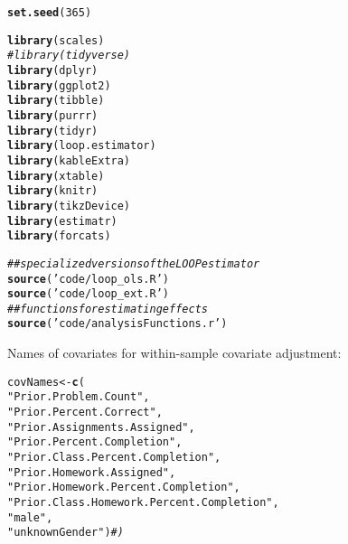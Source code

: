 \documentclass[12pt]{article}\usepackage[]{graphicx}\usepackage[]{xcolor}
\makeatletter
\newcommand{\hlnum}[1]{\textcolor[rgb]{0.686,0.059,0.569}{#1}}%
\newcommand{\hlstr}[1]{\textcolor[rgb]{0.192,0.494,0.8}{#1}}%
\newcommand{\hlcom}[1]{\textcolor[rgb]{0.678,0.584,0.686}{\textit{#1}}}%
\newcommand{\hlstd}[1]{\textcolor[rgb]{0.345,0.345,0.345}{#1}}%
\newcommand{\hlkwb}[1]{\textcolor[rgb]{0.69,0.353,0.396}{#1}}%
\newcommand{\hlkwd}[1]{\textcolor[rgb]{0.737,0.353,0.396}{\textbf{#1}}}%
\newenvironment{kframe}{%
 \def\at@end@of@kframe{}%
 \ifinner\ifhmode%
  \def\at@end@of@kframe{\end{minipage}}%
  \begin{minipage}{\columnwidth}%
 \fi\fi%
 \def\FrameCommand##1{\hskip\@totalleftmargin \hskip-\fboxsep
 \colorbox{shadecolor}{##1}\hskip-\fboxsep
     \hskip-\linewidth \hskip-\@totalleftmargin \hskip\columnwidth}%
 \MakeFramed {\advance\hsize-\width
   \@totalleftmargin\z@ \linewidth\hsize
   \@setminipage}}%
 {\par\unskip\endMakeFramed%
 \at@end@of@kframe}
\newenvironment{knitrout}{}{} %
\makeatother
\begin{document}
\begin{knitrout}
\color{fgcolor}\begin{kframe}
\begin{alltt}
\hlkwd{set.seed}\hlstd{(}\hlnum{365}\hlstd{)}
\end{alltt}
\end{kframe}
\end{knitrout}

\begin{knitrout}
\color{fgcolor}\begin{kframe}
\begin{alltt}
\hlkwd{library}\hlstd{(scales)}
\hlcom{#library(tidyverse)}
\hlkwd{library}\hlstd{(dplyr)}
\hlkwd{library}\hlstd{(ggplot2)}
\hlkwd{library}\hlstd{(tibble)}
\hlkwd{library}\hlstd{(purrr)}
\hlkwd{library}\hlstd{(tidyr)}
\hlkwd{library}\hlstd{(loop.estimator)}
\hlkwd{library}\hlstd{(kableExtra)}
\hlkwd{library}\hlstd{(xtable)}
\hlkwd{library}\hlstd{(knitr)}
\hlkwd{library}\hlstd{(tikzDevice)}
\hlkwd{library}\hlstd{(estimatr)}
\hlkwd{library}\hlstd{(forcats)}


\hlcom{## specialized versions of the LOOP estimator}
\hlkwd{source}\hlstd{(}\hlstr{'code/loop_ols.R'}\hlstd{)}
\hlkwd{source}\hlstd{(}\hlstr{'code/loop_ext.R'}\hlstd{)}
\hlcom{## functions for estimating effects}
\hlkwd{source}\hlstd{(}\hlstr{'code/analysisFunctions.r'}\hlstd{)}
\end{alltt}
\end{kframe}
\end{knitrout}

Names of covariates for within-sample covariate adjustment:
\begin{knitrout}
\color{fgcolor}\begin{kframe}
\begin{alltt}
\hlstd{covNames} \hlkwb{<-} \hlkwd{c}\hlstd{(}
    \hlstr{"Prior.Problem.Count"}\hlstd{,}
    \hlstr{"Prior.Percent.Correct"}\hlstd{,}
    \hlstr{"Prior.Assignments.Assigned"}\hlstd{,}
    \hlstr{"Prior.Percent.Completion"}\hlstd{,}
    \hlstr{"Prior.Class.Percent.Completion"}\hlstd{,}
    \hlstr{"Prior.Homework.Assigned"}\hlstd{,}
    \hlstr{"Prior.Homework.Percent.Completion"}\hlstd{,}
    \hlstr{"Prior.Class.Homework.Percent.Completion"}\hlstd{,}
    \hlstr{"male"}\hlstd{,}
    \hlstr{"unknownGender"}\hlstd{)}\hlcom{#)}
\end{alltt}
\end{kframe}
\end{knitrout}
\end{document}
